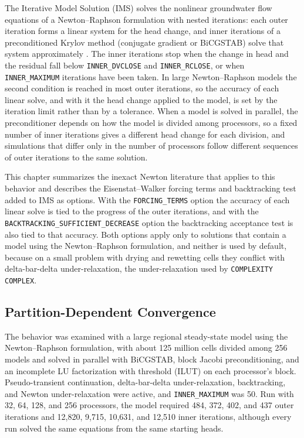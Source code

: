 The Iterative Model Solution (IMS) solves the nonlinear groundwater flow equations of a Newton--Raphson formulation with nested iterations: each outer iteration forms a linear system for the head change, and inner iterations of a preconditioned Krylov method (conjugate gradient or BiCGSTAB) solve that system approximately \citep{modflow6framework}. The inner iterations stop when the change in head and the residual fall below \texttt{INNER\_DVCLOSE} and \texttt{INNER\_RCLOSE}, or when \texttt{INNER\_MAXIMUM} iterations have been taken. In large Newton--Raphson models the second condition is reached in most outer iterations, so the accuracy of each linear solve, and with it the head change applied to the model, is set by the iteration limit rather than by a tolerance. When a model is solved in parallel, the preconditioner depends on how the model is divided among processors, so a fixed number of inner iterations gives a different head change for each division, and simulations that differ only in the number of processors follow different sequences of outer iterations to the same solution.

This chapter summarizes the inexact Newton literature that applies to this behavior and describes the Eisenstat--Walker forcing terms and backtracking test added to IMS as options. With the \texttt{FORCING\_TERMS} option the accuracy of each linear solve is tied to the progress of the outer iterations, and with the \texttt{BACKTRACKING\_SUFFICIENT\_DECREASE} option the backtracking acceptance test is also tied to that accuracy. Both options apply only to solutions that contain a model using the Newton--Raphson formulation, and neither is used by default, because on a small problem with drying and rewetting cells they conflict with delta-bar-delta under-relaxation, the under-relaxation used by \texttt{COMPLEXITY COMPLEX}.

\subsection{Partition-Dependent Convergence}

The behavior was examined with a large regional steady-state model using the Newton--Raphson formulation, with about 125 million cells divided among 256 models and solved in parallel with BiCGSTAB, block Jacobi preconditioning, and an incomplete LU factorization with threshold (ILUT) on each processor's block. Pseudo-transient continuation, delta-bar-delta under-relaxation, backtracking, and Newton under-relaxation were active, and \texttt{INNER\_MAXIMUM} was 50. Run with 32, 64, 128, and 256 processors, the model required 484, 372, 402, and 437 outer iterations and 12,820, 9,715, 10,631, and 12,510 inner iterations, although every run solved the same equations from the same starting heads.

